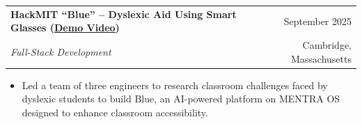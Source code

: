 \documentclass[10pt, letterpaper]{article}
\makeatletter
\newcommand{\jobheader}[4]{%
  \begin{tabularx}{\textwidth}{@{}X r@{}}
    \textbf{#1} & #2 \\
    \textit{#3} & #4 \\
  \end{tabularx}%
  \vspace{1pt}%
}
\makeatother
\begin{document}
\vspace{4pt}

\jobheader{HackMIT ``Blue'' -- Dyslexic Aid Using Smart Glasses (\href{https://www.youtube.com/watch?v=X4b1lVUkip0}{\underline{Demo Video}})}{September 2025}
          {Full-Stack Development}{Cambridge, Massachusetts}
\begin{itemize}
  \item Led a team of three engineers to research classroom challenges faced by dyslexic students to build Blue, an AI-powered platform on MENTRA OS designed to enhance classroom accessibility.
\end{itemize}
\end{document}

